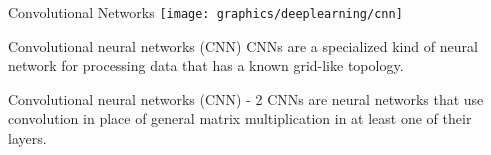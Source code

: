     \begin{frame}{Convolutional Networks}
        \texttt{[image: graphics/deeplearning/cnn]}
         {
            \begin{block}{Convolutional neural networks (CNN)}
                CNNs are a specialized kind of neural network for processing data that has a known grid-like topology.
            \end{block}
        }
         {
            \begin{block}{Convolutional neural networks (CNN) - 2}
                CNNs are neural networks that use convolution in place of general matrix multiplication in at least one of their layers.
            \end{block}
        }
    \end{frame}